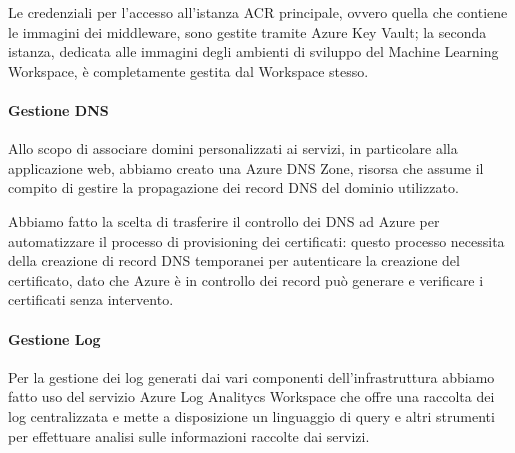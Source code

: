 Le credenziali per l'accesso all'istanza ACR principale, ovvero quella che contiene le immagini dei middleware, sono gestite tramite Azure Key Vault; la seconda istanza, dedicata alle immagini degli ambienti di sviluppo del Machine Learning Workspace, è completamente gestita dal Workspace stesso.

\paragraph{Gestione DNS}
Allo scopo di associare domini personalizzati ai servizi, in particolare alla applicazione web, abbiamo creato una Azure DNS Zone, risorsa che assume il compito di gestire la propagazione dei record DNS del dominio utilizzato.

Abbiamo fatto la scelta di trasferire il controllo dei DNS ad Azure per automatizzare il processo di provisioning dei certificati: questo processo necessita della creazione di record DNS temporanei per autenticare la creazione del certificato, dato che Azure è in controllo dei record può generare e verificare i certificati senza intervento.

\paragraph{Gestione Log}
Per la gestione dei log generati dai vari componenti dell'infrastruttura abbiamo fatto uso del servizio Azure Log Analitycs Workspace che offre una raccolta dei log centralizzata e mette a disposizione un linguaggio di query e altri strumenti per effettuare analisi sulle informazioni raccolte dai servizi.







